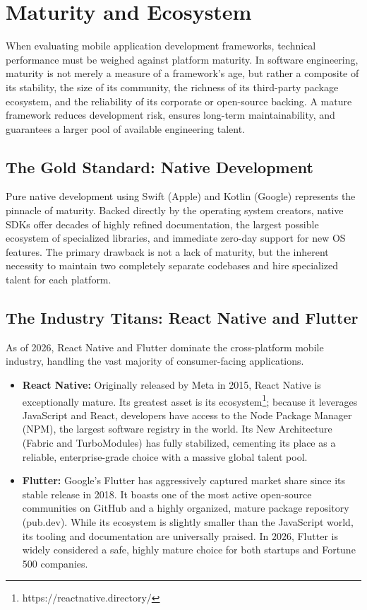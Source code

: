 \chapter{Maturity and Ecosystem}\label{chap:maturity}

When evaluating mobile application development frameworks, technical performance must be weighed against platform maturity. In software engineering, maturity is not merely a measure of a framework's age, but rather a composite of its stability, the size of its community, the richness of its third-party package ecosystem, and the reliability of its corporate or open-source backing. A mature framework reduces development risk, ensures long-term maintainability, and guarantees a larger pool of available engineering talent.

\section{The Gold Standard: Native Development}
Pure native development using Swift (Apple) and Kotlin (Google) represents the pinnacle of maturity. Backed directly by the operating system creators, native SDKs offer decades of highly refined documentation, the largest possible ecosystem of specialized libraries, and immediate zero-day support for new OS features. The primary drawback is not a lack of maturity, but the inherent necessity to maintain two completely separate codebases and hire specialized talent for each platform.

\section{The Industry Titans: React Native and Flutter}
As of 2026, React Native and Flutter dominate the cross-platform mobile industry, handling the vast majority of consumer-facing applications.
\begin{itemize}
    \item \textbf{React Native:} Originally released by Meta in 2015, React Native is exceptionally mature. Its greatest asset is its ecosystem\footnote{https://reactnative.directory/}; because it leverages JavaScript and React, developers have access to the Node Package Manager (NPM), the largest software registry in the world. Its New Architecture (Fabric and TurboModules) has fully stabilized, cementing its place as a reliable, enterprise-grade choice with a massive global talent pool.
    \item \textbf{Flutter:} Google's Flutter has aggressively captured market share since its stable release in 2018. It boasts one of the most active open-source communities on GitHub and a highly organized, mature package repository (pub.dev). While its ecosystem is slightly smaller than the JavaScript world, its tooling and documentation are universally praised. In 2026, Flutter is widely considered a safe, highly mature choice for both startups and Fortune 500 companies.
\end{itemize}

